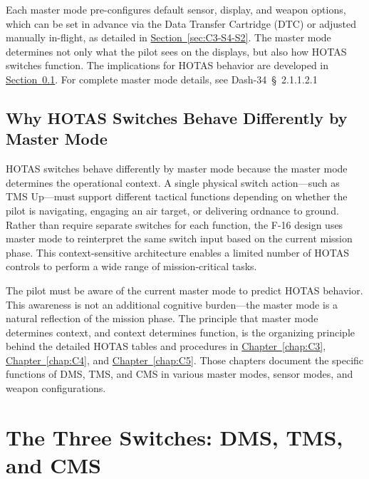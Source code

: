 \documentclass[11pt, a4paper, twoside]{report}
\newcommand{\dashref}[1]{Dash-34~\S~#1}
\newcommand{\secref}[1]{\hyperref[#1]{Section~\ref*{#1}}}
\newcommand{\chapref}[1]{\hyperref[#1]{Chapter~\ref*{#1}}}
\begin{document}
Each master mode pre-configures default sensor, display, and weapon options, which can be set in advance via the Data Transfer Cartridge (DTC) or adjusted manually in-flight, as detailed in \secref{sec:C3-S4-S2}. The master mode determines not only what the pilot sees on the displays, but also how HOTAS switches function. The implications for HOTAS behavior are developed in \secref{sec:C2-S2-S2}. For complete master mode details, see \dashref{2.1.1.2.1}

\subsection{Why HOTAS Switches Behave Differently by Master Mode}
\label{sec:C2-S2-S2}

HOTAS switches behave differently by master mode because the master mode determines the operational context. A single physical switch action—such as TMS Up—must support different tactical functions depending on whether the pilot is navigating, engaging an air target, or delivering ordnance to ground. Rather than require separate switches for each function, the F-16 design uses master mode to reinterpret the same switch input based on the current mission phase. This context-sensitive architecture enables a limited number of HOTAS controls to perform a wide range of mission-critical tasks.

The pilot must be aware of the current master mode to predict HOTAS behavior. This awareness is not an additional cognitive burden—the master mode is a natural reflection of the mission phase. The principle that master mode determines context, and context determines function, is the organizing principle behind the detailed HOTAS tables and procedures in \chapref{chap:C3}, \chapref{chap:C4}, and \chapref{chap:C5}. Those chapters document the specific functions of DMS, TMS, and CMS in various master modes, sensor modes, and weapon configurations.

\section{The Three Switches: DMS, TMS, and CMS}
\label{sec:C2-S3}
\end{document}
